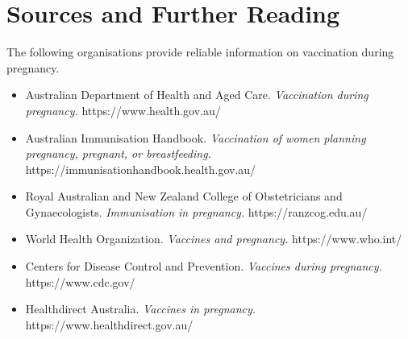 \section*{Sources and Further Reading}
The following organisations provide reliable information on vaccination during pregnancy.

\begin{itemize}
    \item Australian Department of Health and Aged Care. \textit{Vaccination during pregnancy.} https://www.health.gov.au/
    \item Australian Immunisation Handbook. \textit{Vaccination of women planning pregnancy, pregnant, or breastfeeding.} https://immunisationhandbook.health.gov.au/
    \item Royal Australian and New Zealand College of Obstetricians and Gynaecologists. \textit{Immunisation in pregnancy.} https://ranzcog.edu.au/
    \item World Health Organization. \textit{Vaccines and pregnancy.} https://www.who.int/
    \item Centers for Disease Control and Prevention. \textit{Vaccines during pregnancy.} https://www.cdc.gov/
    \item Healthdirect Australia. \textit{Vaccines in pregnancy.} https://www.healthdirect.gov.au/
\end{itemize}
